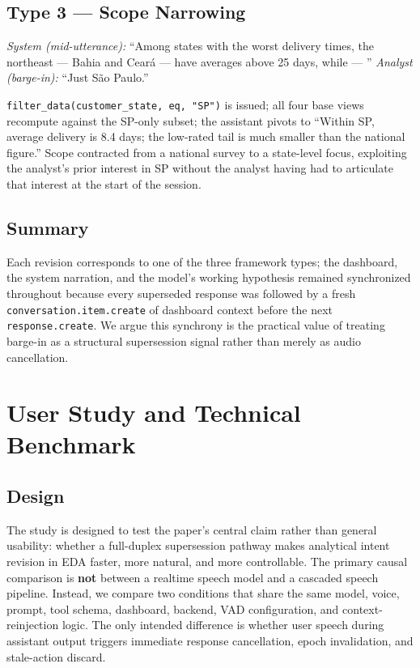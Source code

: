 \documentclass[journal]{IEEEtran}
\begin{document}
\subsection{Type 3 --- Scope Narrowing}
\emph{System (mid-utterance):} ``Among states with the worst delivery times, the northeast --- Bahia and Cear\'a --- have averages above 25 days, while --- ''
\emph{Analyst (barge-in):} ``Just S\~ao Paulo.''

\texttt{filter\_data(customer\_state, eq, "SP")} is issued; all four base views recompute against the SP-only subset; the assistant pivots to ``Within SP, average delivery is 8.4 days; the low-rated tail is much smaller than the national figure.'' Scope contracted from a national survey to a state-level focus, exploiting the analyst's prior interest in SP without the analyst having had to articulate that interest at the start of the session.

\subsection{Summary}
Each revision corresponds to one of the three framework types; the dashboard, the system narration, and the model's working hypothesis remained synchronized throughout because every superseded response was followed by a fresh \texttt{conversation.item.create} of dashboard context before the next \texttt{response.create}. We argue this synchrony is the practical value of treating barge-in as a structural supersession signal rather than merely as audio cancellation.

\section{User Study and Technical Benchmark}
\label{sec:study}

\subsection{Design}
The study is designed to test the paper's central claim rather than general usability: whether a full-duplex supersession pathway makes analytical intent revision in EDA faster, more natural, and more controllable. The primary causal comparison is \textbf{not} between a realtime speech model and a cascaded speech pipeline. Instead, we compare two conditions that share the same model, voice, prompt, tool schema, dashboard, backend, VAD configuration, and context-reinjection logic. The only intended difference is whether user speech during assistant output triggers immediate response cancellation, epoch invalidation, and stale-action discard.
\end{document}
